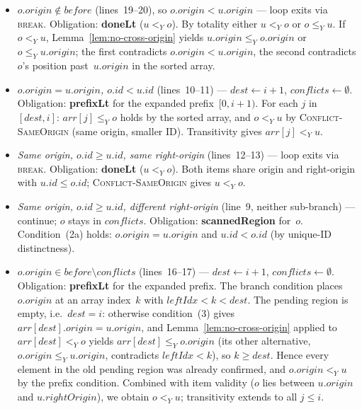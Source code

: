 \documentclass[sigplan,screen]{acmart}
\newcommand{\YjsLt}{\mathrel{<_Y}}
\newcommand{\YjsLeq}{\mathrel{\leq_Y}}
\begin{document}
\begin{itemize}
\item \emph{$o.\mathit{origin} \notin \mathit{before}$} (lines~19--20),
  so $o.\mathit{origin} < u.\mathit{origin}$ ---
  loop exits via \textsc{break}.
  Obligation: \textbf{doneLt} ($u \YjsLt o$).
  By totality either $u \YjsLt o$ or $o \YjsLeq u$.
  If $o \YjsLt u$, Lemma~\ref{lem:no-cross-origin} yields
  $u.\mathit{origin} \YjsLeq o.\mathit{origin}$ or
  $o \YjsLeq u.\mathit{origin}$;
  the first contradicts $o.\mathit{origin} < u.\mathit{origin}$,
  the second contradicts $o$'s position past~$u.\mathit{origin}$
  in the sorted array.

\item \emph{$o.\mathit{origin} = u.\mathit{origin}$,
  $o.\mathit{id} < u.\mathit{id}$} (lines~10--11) ---
  $\mathit{dest} \leftarrow i{+}1$,
  $\mathit{conflicts} \leftarrow \emptyset$.
  Obligation: \textbf{prefixLt} for the expanded
  prefix~$[0, i{+}1)$.
  For each $j$ in $[\mathit{dest}, i]$:
  $\mathit{arr}[j] \YjsLeq o$ holds by the sorted array, and
  $o \YjsLt u$ by \textsc{Conflict-SameOrigin}
  (same origin, smaller ID).
  Transitivity gives $\mathit{arr}[j] \YjsLt u$.

\item \emph{Same origin, $o.\mathit{id} \geq u.\mathit{id}$,
  same right-origin} (lines~12--13) ---
  loop exits via \textsc{break}.
  Obligation: \textbf{doneLt} ($u \YjsLt o$).
  Both items share origin and right-origin with
  $u.\mathit{id} \leq o.\mathit{id}$;
  \textsc{Conflict-SameOrigin} gives $u \YjsLt o$.

\item \emph{Same origin, $o.\mathit{id} \geq u.\mathit{id}$,
  different right-origin} (line~9, neither sub-branch) ---
  continue; $o$ stays in $\mathit{conflicts}$.
  Obligation: \textbf{scannedRegion} for~$o$.
  Condition~(2a) holds:
  $o.\mathit{origin} = u.\mathit{origin}$
  and $u.\mathit{id} < o.\mathit{id}$
  (by unique-ID distinctness).

\item \emph{$o.\mathit{origin} \in \mathit{before} \setminus
  \mathit{conflicts}$} (lines~16--17) ---
  $\mathit{dest} \leftarrow i{+}1$,
  $\mathit{conflicts} \leftarrow \emptyset$.
  Obligation: \textbf{prefixLt} for the expanded prefix.
  The branch condition places $o.\mathit{origin}$ at an
  array index~$k$ with $\mathit{leftIdx} < k < \mathit{dest}$.
  The pending region is empty, i.e.\ $\mathit{dest} = i$:
  otherwise condition~(3) gives
  $\mathit{arr}[\mathit{dest}].\mathit{origin} = u.\mathit{origin}$,
  and Lemma~\ref{lem:no-cross-origin} applied to
  $\mathit{arr}[\mathit{dest}] \YjsLt o$ yields
  $\mathit{arr}[\mathit{dest}] \YjsLeq o.\mathit{origin}$
  (its other alternative,
  $o.\mathit{origin} \YjsLeq u.\mathit{origin}$,
  contradicts $\mathit{leftIdx} < k$), so $k \geq \mathit{dest}$.
  Hence every element in the old pending region was
  already confirmed, and $o.\mathit{origin} \YjsLt u$
  by the prefix condition.
  Combined with item validity ($o$ lies between
  $u.\mathit{origin}$ and $u.\mathit{rightOrigin}$),
  we obtain $o \YjsLt u$; transitivity
  extends to all $j \leq i$.


\end{itemize}
\end{document}
